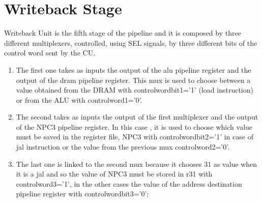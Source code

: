 \chapter{Writeback Stage}
\label{Writeback Unit}
Writeback Unit is the fifth stage of the pipeline and it is composed by three different multiplexers, controlled, using SEL signals, by three different bits of the control word sent by the CU.
\begin{enumerate} 
    \item The first one takes as inputs the output of the alu pipeline register and the output of the dram pipeline register. This mux is used to choose between a value obtained
    from the DRAM with controlwordbit1='1' (load instruction) or from the ALU with controlword1='0'.
    \item The second takes as inputs the output of the first multiplexer and the output of the NPC3 pipeline register. In this case , it is used to choose which value must be saved
    in the register file, NPC3 with controlwordbit2='1' in case of jal instruction or the value from the previous mux controlword2='0'.
    \item The last one is linked to the second mux because it chooses 31 as value when it is a jal and so the value of NPC3 must be stored in r31 with controlword3='1', in the other cases
    the value of the address destination pipeline register with controlwordbit3='0';
\end{enumerate}